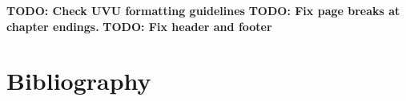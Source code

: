 \documentclass[letterpaper, 11pt, openany, notitlepage]{report}
\begin{document}

\textbf{TODO: Check UVU formatting guidelines}
\textbf{TODO: Fix page breaks at chapter endings.}
\textbf{TODO: Fix header and footer}


\tableofcontents
\listoftables
\listoffigures

\newpage

\pagestyle{fancy}

\begin{multicols}{2}










%



\end{multicols}
\newpage
\appendix


\chapter{Bibliography}
\printbibliography[heading=none]



%
\end{document}

